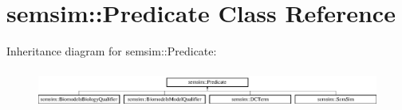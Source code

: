 \hypertarget{classsemsim_1_1Predicate}{}\section{semsim\+:\+:Predicate Class Reference}
\label{classsemsim_1_1Predicate}
Inheritance diagram for semsim\+:\+:Predicate\+:\begin{figure}[H]
\begin{center}
\leavevmode
\includegraphics[height=1.308411cm]{classsemsim_1_1Predicate}
\end{center}
\end{figure}

